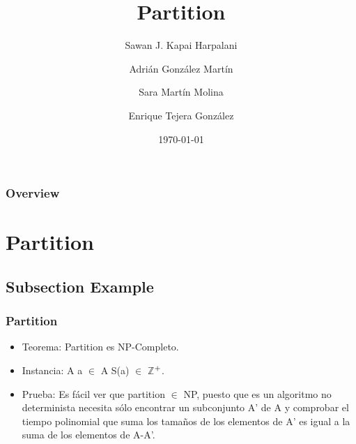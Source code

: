 \documentclass{beamer}
\title[Short title]{ Partition }
\author{Sawan J. Kapai Harpalani \and
	Adri\'an Gonz\'alez Mart\'in \and
	Sara Mart\'in Molina \and
	Enrique Tejera Gonz\'alez
}
\institute[ULL] 
{
Universidad de La Laguna \\ 
\medskip
}
\date{\today}
\begin{document}
\begin{frame}

\titlepage 

\end{frame}

\begin{frame}

\frametitle{Overview} 

\tableofcontents 
\end{frame}


\section{Partition} 

\subsection{Subsection Example} 

\begin{frame}
\frametitle{Partition}
\begin{itemize}
  \item Teorema: Partition es NP-Completo.
  \item Instancia:  A  a $\in$ A S(a) $\in$ \(\mathbb{Z}\)$\textsuperscript{+}$.
  \item Prueba: Es f\'acil ver que partition $\in$ NP, puesto que es un algoritmo
  no determinista necesita s\'olo encontrar un subconjunto A' de A y comprobar el
  tiempo polinomial que suma los tama\~{n}os de los elementos de A' es igual a la
  suma de los elementos de A-A'.
  
\end{itemize}  
\end{frame}
\end{document}
